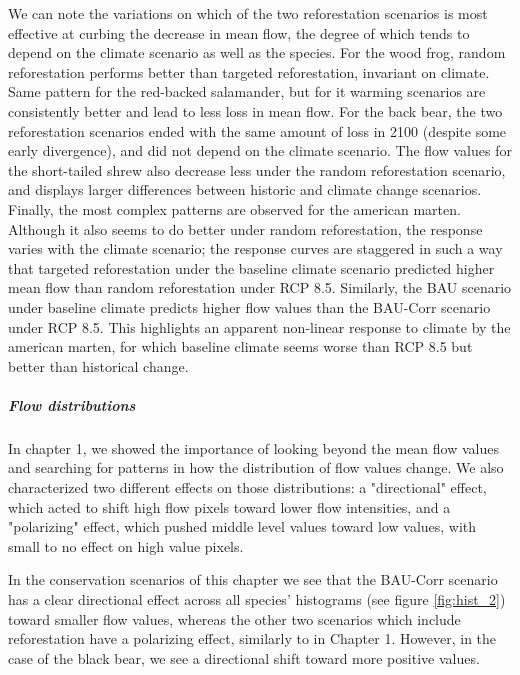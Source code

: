 {We can note the variations on which of the two reforestation scenarios is most effective at curbing the decrease in mean flow, the degree of which tends to depend on the climate scenario as well as the species. For the wood frog, random reforestation performs better than targeted reforestation, invariant on climate. Same pattern for the red-backed salamander, but for it warming scenarios are consistently better and lead to less loss in mean flow. For the back bear, the two reforestation scenarios ended with the same amount of loss in 2100 (despite some early divergence), and did not depend on the climate scenario. The flow values for the short-tailed shrew also decrease less under the random reforestation scenario, and displays larger differences between historic and climate change scenarios. Finally, the most complex patterns are observed for the american marten.  Although it also seems to do better under random reforestation,  the response varies with the climate scenario; the response curves are staggered in such a way that targeted reforestation under the baseline climate scenario predicted higher mean flow than random reforestation under RCP 8.5. Similarly, the BAU scenario under baseline climate predicts higher flow values than the BAU-Corr scenario under RCP 8.5. This highlights an apparent non-linear response to climate by the american marten, for which baseline climate seems worse than RCP 8.5 but better than historical change.

\vspace{1em}

\subparagraph*{\textit{Flow distributions}} In chapter 1, we showed the importance of looking beyond the mean flow values and searching for patterns in how the distribution of flow values change. We also characterized two different effects on those distributions: a "directional" effect, which acted to shift high flow pixels toward lower flow intensities, and a "polarizing" effect, which pushed middle level values toward low values, with small to no effect on high value pixels.

In the conservation scenarios of this chapter we see that the BAU-Corr scenario has a clear directional effect across all species' histograms (see figure \ref{fig:hist_2}) toward smaller flow values, whereas the other two scenarios which include reforestation have a polarizing effect, similarly to in Chapter 1. However, in the case of the black bear, we see a directional shift toward more positive values.

\vspace{1em}

}
